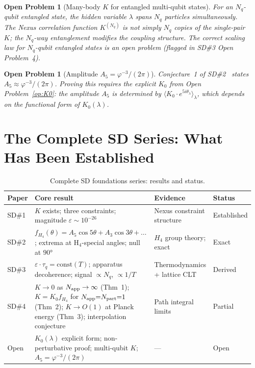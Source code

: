 \documentclass[11pt,a4paper]{article}
\newtheorem{openprob}[theorem]{Open Problem}
\newcommand{\phig}{\varphi}
\newcommand{\eps}{\varepsilon}
\newcommand{\Napp}{N_{\rm app}}
\newcommand{\Npart}{N_{\rm part}}
\begin{document}
\begin{openprob}[Many-body $K$ for entangled multi-qubit states]
\label{op:multiqubit}
For an $N_q$-qubit entangled state, the hidden variable $\lambda$
spans $N_q$ particles simultaneously.  The Nexus correlation
function $K^{(N_q)}$ is not simply $N_q$ copies of the single-pair
$K$; the $N_q$-way entanglement modifies the coupling structure.
The correct scaling law for $N_q$-qubit entangled states is an
open problem (flagged in SD\#3 Open Problem~4).
\end{openprob}

\begin{openprob}[Amplitude $A_5 = \phig^{-3}/(2\pi)$]
\label{op:A5}
Conjecture~1 of SD\#2~\citep{cpp_sd2} states $A_5 \approx
\phig^{-3}/(2\pi)$.  Proving this requires the explicit $K_0$
from Open Problem~\ref{op:K0}: the amplitude $A_5$ is determined
by $\langle K_0 \cdot e^{5i\theta_\lambda}\rangle_\lambda$, which
depends on the functional form of $K_0(\lambda)$.
\end{openprob}

\section{The Complete SD Series: What Has Been Established}

\begin{table}[H]
\centering
\caption{Complete SD foundations series: results and status.}
\label{tab:series_status}
\begin{tabular}{@{}p{1cm}p{4.5cm}p{4.5cm}p{2.5cm}@{}}
\toprule
Paper & Core result & Evidence & Status \\
\midrule
SD\#1 & $K$ exists; three constraints; magnitude $\eps \sim 10^{-26}$ &
  Nexus constraint structure & Established \\[4pt]
SD\#2 & $f_{H_4}(\theta) = A_5\cos5\theta + A_3\cos3\theta + \ldots$;
  extrema at H$_4$-special angles; null at $90°$ &
  $H_4$ group theory; exact & Exact \\[4pt]
SD\#3 & $\eps\cdot\tau_q = \text{const}(T)$; apparatus decoherence;
  signal $\propto N_q$, $\propto 1/T$ &
  Thermodynamics + lattice CLT & Derived \\[4pt]
SD\#4 & $K\to0$ as $\Napp\to\infty$ (Thm~1); $K = K_0 f_{H_4}$ for
  $\Napp{=}\Npart{=}1$ (Thm~2); $K\to O(1)$ at Planck energy (Thm~3);
  interpolation conjecture & Path integral limits & Partial \\[4pt]
\midrule
Open & $K_0(\lambda)$ explicit form; non-perturbative proof;
  multi-qubit $K$; $A_5 = \phig^{-3}/(2\pi)$ & --- & Open \\
\bottomrule
\end{tabular}
\end{table}
\end{document}
